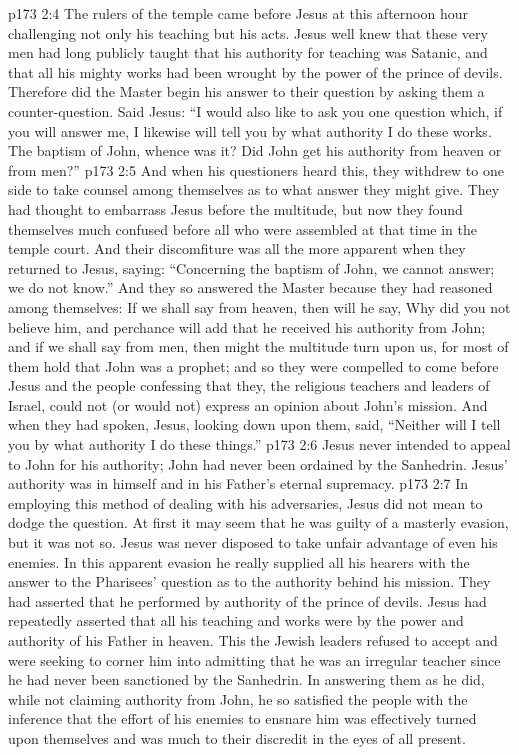 \vs p173 2:4 The rulers of the temple came before Jesus at this afternoon hour challenging not only his teaching but his acts. Jesus well knew that these very men had long publicly taught that his authority for teaching was Satanic, and that all his mighty works had been wrought by the power of the prince of devils. Therefore did the Master begin his answer to their question by asking them a counter\hyp{}question. Said Jesus: \textcolor{ubdarkred}{“I would also like to ask you one question which, if you will answer me, I likewise will tell you by what authority I do these works. The baptism of John, whence was it? Did John get his authority from heaven or from men?”}
\vs p173 2:5 And when his questioners heard this, they withdrew to one side to take counsel among themselves as to what answer they might give. They had thought to embarrass Jesus before the multitude, but now they found themselves much confused before all who were assembled at that time in the temple court. And their discomfiture was all the more apparent when they returned to Jesus, saying: “Concerning the baptism of John, we cannot answer; we do not know.” And they so answered the Master because they had reasoned among themselves: If we shall say from heaven, then will he say, Why did you not believe him, and perchance will add that he received his authority from John; and if we shall say from men, then might the multitude turn upon us, for most of them hold that John was a prophet; and so they were compelled to come before Jesus and the people confessing that they, the religious teachers and leaders of Israel, could not (or would not) express an opinion about John’s mission. And when they had spoken, Jesus, looking down upon them, said, \textcolor{ubdarkred}{“Neither will I tell you by what authority I do these things.”}
\vs p173 2:6 \pc Jesus never intended to appeal to John for his authority; John had never been ordained by the Sanhedrin. Jesus’ authority was in himself and in his Father’s eternal supremacy.
\vs p173 2:7 In employing this method of dealing with his adversaries, Jesus did not mean to dodge the question. At first it may seem that he was guilty of a masterly evasion, but it was not so. Jesus was never disposed to take unfair advantage of even his enemies. In this apparent evasion he really supplied all his hearers with the answer to the Pharisees’ question as to the authority behind his mission. They had asserted that he performed by authority of the prince of devils. Jesus had repeatedly asserted that all his teaching and works were by the power and authority of his Father in heaven. This the Jewish leaders refused to accept and were seeking to corner him into admitting that he was an irregular teacher since he had never been sanctioned by the Sanhedrin. In answering them as he did, while not claiming authority from John, he so satisfied the people with the inference that the effort of his enemies to ensnare him was effectively turned upon themselves and was much to their discredit in the eyes of all present.
